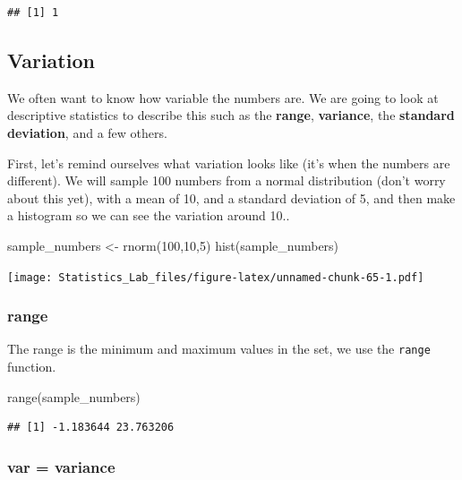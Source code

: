 \documentclass[
]{book}
\newenvironment{Shaded}{\begin{snugshade}}{\end{snugshade}}
\newcommand{\DecValTok}[1]{\textcolor[rgb]{0.00,0.00,0.81}{#1}}
\newcommand{\FunctionTok}[1]{\textcolor[rgb]{0.00,0.00,0.00}{#1}}
\newcommand{\NormalTok}[1]{#1}
\newcommand{\OtherTok}[1]{\textcolor[rgb]{0.56,0.35,0.01}{#1}}
\begin{document}
\begin{verbatim}
## [1] 1
\end{verbatim}

\hypertarget{variation}{%
\subsection{Variation}\label{variation}}

We often want to know how variable the numbers are. We are going to look at descriptive statistics to describe this such as the \textbf{range}, \textbf{variance}, the \textbf{standard deviation}, and a few others.

First, let's remind ourselves what variation looks like (it's when the numbers are different). We will sample 100 numbers from a normal distribution (don't worry about this yet), with a mean of 10, and a standard deviation of 5, and then make a histogram so we can see the variation around 10..

\begin{Shaded}
\begin{Highlighting}[]
\NormalTok{sample\_numbers }\OtherTok{\textless{}{-}} \FunctionTok{rnorm}\NormalTok{(}\DecValTok{100}\NormalTok{,}\DecValTok{10}\NormalTok{,}\DecValTok{5}\NormalTok{)}
\FunctionTok{hist}\NormalTok{(sample\_numbers)}
\end{Highlighting}
\end{Shaded}

\texttt{[image: Statistics\_Lab\_files/figure-latex/unnamed-chunk-65-1.pdf]}

\hypertarget{range}{%
\subsubsection{range}\label{range}}

The range is the minimum and maximum values in the set, we use the \texttt{range} function.

\begin{Shaded}
\begin{Highlighting}[]
\FunctionTok{range}\NormalTok{(sample\_numbers)}
\end{Highlighting}
\end{Shaded}

\begin{verbatim}
## [1] -1.183644 23.763206
\end{verbatim}

\hypertarget{var-variance}{%
\subsubsection{var = variance}\label{var-variance}}
\end{document}
